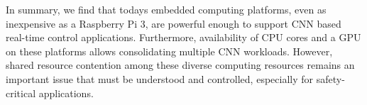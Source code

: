 



In summary, we find that todays embedded computing platforms, even as
inexpensive as a Raspberry Pi 3, are powerful enough to support
CNN based real-time control applications. Furthermore, availability of
CPU cores and a GPU on these platforms allows consolidating multiple CNN
workloads. However, shared resource contention among these diverse
computing resources remains an important issue that must be understood
and controlled, especially for safety-critical applications.
